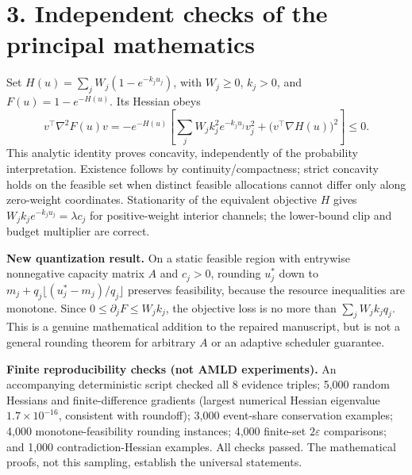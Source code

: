 \documentclass[10pt,letterpaper]{article}
\begin{document}
\section*{3. Independent checks of the principal mathematics}
Set $H(u)=\sum_jW_j(1-e^{-k_ju_j})$, with $W_j\ge0$, $k_j>0$, and $F(u)=1-e^{-H(u)}$. Its Hessian obeys
\[
v^\top\nabla^2F(u)v=-e^{-H(u)}\left[\sum_j W_jk_j^2e^{-k_ju_j}v_j^2+\bigl(v^\top\nabla H(u)\bigr)^2\right]\le0.
\]
This analytic identity proves concavity, independently of the probability interpretation. Existence follows by continuity/compactness; strict concavity holds on the feasible set when distinct feasible allocations cannot differ only along zero-weight coordinates. Stationarity of the equivalent objective $H$ gives $W_jk_je^{-k_ju_j}=\lambda c_j$ for positive-weight interior channels; the lower-bound clip and budget multiplier are correct.

\textbf{New quantization result.} On a static feasible region with entrywise nonnegative capacity matrix $A$ and $c_j>0$, rounding $u_j^*$ down to $m_j+q_j\lfloor(u_j^*-m_j)/q_j\rfloor$ preserves feasibility, because the resource inequalities are monotone. Since $0\le\partial_jF\le W_jk_j$, the objective loss is no more than $\sum_j W_jk_jq_j$. This is a genuine mathematical addition to the repaired manuscript, but is not a general rounding theorem for arbitrary $A$ or an adaptive scheduler guarantee.

\textbf{Finite reproducibility checks (not AMLD experiments).} An accompanying deterministic script checked all 8 evidence triples; 5,000 random Hessians and finite-difference gradients (largest numerical Hessian eigenvalue $1.7\times10^{-16}$, consistent with roundoff); 3,000 event-share conservation examples; 4,000 monotone-feasibility rounding instances; 4,000 finite-set $2\varepsilon$ comparisons; and 1,000 contradiction-Hessian examples. All checks passed. The mathematical proofs, not this sampling, establish the universal statements.
\end{document}
